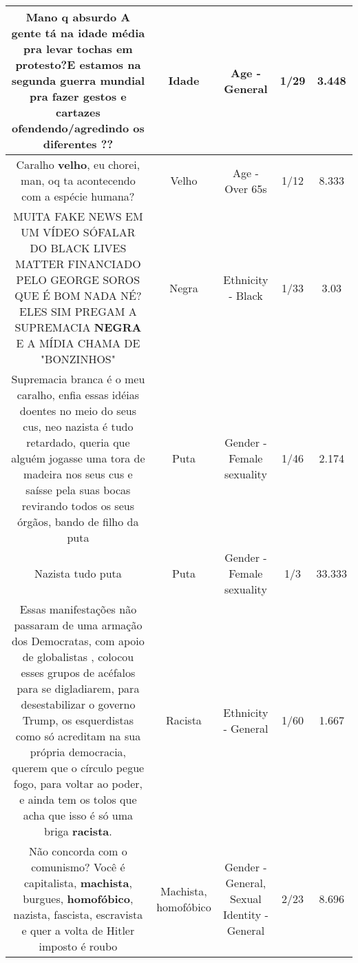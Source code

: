 \documentclass[11pt]{article}
\newlength\mylength
\begin{document}
\begin{center}
\begin{longtable}{|C{.65\mylength}|C{.30\mylength}|C{.12\mylength}|C{.12\mylength}|C{.12\mylength}|}
  \small Mano q absurdo A gente tá na \textbf{idade} média pra levar tochas em protesto?E estamos na segunda guerra mundial pra fazer gestos e cartazes ofendendo/agredindo os diferentes ??\normalsize   & Idade & Age - General & 1/29 & 3.448 \\  \hline
  \small Caralho \textbf{velho}, eu chorei, man, oq ta acontecendo com a espécie humana?\normalsize   & Velho & Age - Over 65s & 1/12 & 8.333 \\  \hline
  \small MUITA FAKE NEWS EM UM VÍDEO SÓFALAR DO BLACK LIVES MATTER FINANCIADO PELO GEORGE SOROS QUE É BOM NADA NÉ?ELES SIM PREGAM A SUPREMACIA \textbf{NEGRA} E A MÍDIA CHAMA DE "BONZINHOS"\normalsize   & Negra & Ethnicity - Black & 1/33 & 3.03 \\  \hline
  \small Supremacia branca é o meu caralho, enfia essas idéias doentes no meio do seus cus, neo nazista é tudo retardado, queria que alguém jogasse uma tora de madeira nos seus cus e saísse pela suas bocas revirando todos os seus órgãos, bando de filho da puta\normalsize   & Puta & Gender - Female sexuality & 1/46 & 2.174 \\  \hline
  \small Nazista tudo puta\normalsize   & Puta & Gender - Female sexuality & 1/3 & 33.333 \\  \hline
  \small Essas manifestações não passaram de uma armação dos Democratas, com apoio de  globalistas , colocou esses grupos de acéfalos para se digladiarem, para desestabilizar o governo Trump, os esquerdistas como só acreditam na sua própria democracia, querem que o círculo pegue fogo, para voltar ao poder, e ainda tem os tolos que acha que isso é só uma briga \textbf{racista}.\normalsize   & Racista & Ethnicity - General & 1/60 & 1.667 \\  \hline
  \small Não concorda com o comunismo? Você é capitalista, \textbf{machista}, burgues, \textbf{homofóbico}, nazista, fascista, escravista e quer a volta de Hitler imposto é roubo\normalsize   & Machista, homofóbico & Gender - General, Sexual Identity - General & 2/23 & 8.696 \\  \hline

\end{longtable}
\end{center}
\end{document}
